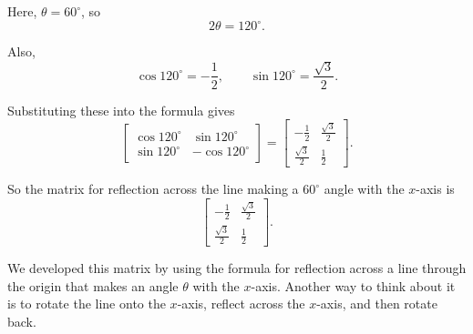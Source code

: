 \documentclass{ximera}
\begin{document}
Here, $\theta=60^\circ$, so
\[
2\theta=120^\circ.
\]

Also,
\[
\cos 120^\circ=-\frac{1}{2},
\qquad
\sin 120^\circ=\frac{\sqrt{3}}{2}.
\]

Substituting these into the formula gives
\[
\begin{bmatrix}
\cos 120^\circ & \sin 120^\circ\\
\sin 120^\circ & -\cos 120^\circ
\end{bmatrix}
=
\begin{bmatrix}
-\frac{1}{2} & \frac{\sqrt{3}}{2}\\
\frac{\sqrt{3}}{2} & \frac{1}{2}
\end{bmatrix}.
\]

So the matrix for reflection across the line making a $60^\circ$ angle with the $x$-axis is
\[
\begin{bmatrix}
-\frac{1}{2} & \frac{\sqrt{3}}{2}\\
\frac{\sqrt{3}}{2} & \frac{1}{2}
\end{bmatrix}.
\]

We developed this matrix by using the formula for reflection across a line through the origin that makes an angle $\theta$ with the $x$-axis. Another way to think about it is to rotate the line onto the $x$-axis, reflect across the $x$-axis, and then rotate back.
\end{document}
